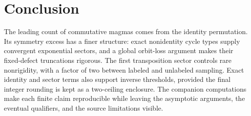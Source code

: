 \documentclass[11pt,letterpaper]{article}
\numberwithin{equation}{section}
\theoremstyle{definition}\newtheorem{definition}[theorem]{Definition}
\theoremstyle{remark}\newtheorem{remark}[theorem]{Remark}
\begin{document}
\section*{Conclusion}
The leading count of commutative magmas comes from the identity permutation. Its symmetry excess has a finer structure: exact nonidentity cycle types supply convergent exponential sectors, and a global orbit-loss argument makes their fixed-defect truncations rigorous. The first transposition sector controls rare nonrigidity, with a factor of two between labeled and unlabeled sampling. Exact identity and sector terms also support inverse thresholds, provided the final integer rounding is kept as a two-ceiling enclosure. The companion computations make each finite claim reproducible while leaving the asymptotic arguments, the eventual qualifiers, and the source limitations visible.
\end{document}
